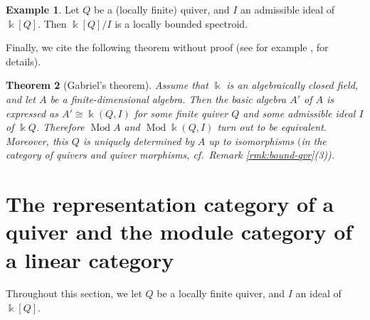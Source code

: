 \documentclass{surv-l}
\numberwithin{equation}{chapter}
\numberwithin{figure}{chapter}
\theoremstyle{plain}
\newtheorem{thm}{Theorem}[section]
\theoremstyle{definition}
\newtheorem{exm}[thm]{Example}
\theoremstyle{remark}
\DeclareMathOperator{\Mod}{Mod}
\begin{document}
\begin{exm}
Let $Q$ be a (locally finite) quiver, and
$I$ an admissible ideal of $\Bbbk[Q]$.
Then $\Bbbk[Q]/I$ is a locally bounded spectroid.
\end{exm}

Finally, we cite the following theorem without proof
(see for example \cite{Asa-lec}, \cite{ASS} for details).

\begin{thm}[Gabriel's theorem]
Assume that $\Bbbk$ is an algebraically closed field,
and let $A$ be a finite-dimensional algebra.
Then the basic algebra $A'$ of $A$ is expressed as
$A' \cong \Bbbk(Q, I)$ for some finite quiver $Q$ and some admissible ideal
$I$ of $\Bbbk Q$.
Therefore $\Mod A$ and $\Mod \Bbbk(Q, I)$ turn out to be equivalent.
Moreover, this $Q$ is uniquely determined by $A$ up to isomorphisms
$($in the category of quivers and quiver morphisms, cf.\ {\rm Remark \ref{rmk:bound-qvr}(3))}.
\end{thm}

\section[The representation category and the module category]{
The representation category of a quiver and the module category of a linear category}

Throughout this section, we let $Q$ be a locally finite quiver, and
$I$ an ideal of $\Bbbk[Q]$.
\end{document}

